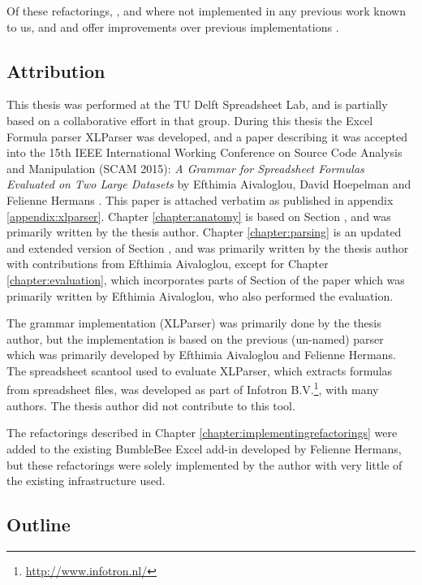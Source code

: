 Of these refactorings, ,  and  where not implemented in any previous work known to us, and  and  offer improvements over previous implementations \cite{badame2012refactoring}.

\newpage

\subsection{Attribution}

This thesis was performed at the TU Delft Spreadsheet Lab, and is partially based on a collaborative effort in that group.
During this thesis the Excel Formula parser XLParser was developed, and a paper describing it was accepted into the 15th IEEE International Working Conference on Source Code Analysis and Manipulation (SCAM 2015): \emph{A Grammar for Spreadsheet Formulas Evaluated on Two Large Datasets} by Efthimia Aivaloglou, David Hoepelman and Felienne Hermans \cite{xlparser}.
This paper is attached verbatim as published in appendix \ref{appendix:xlparser}.
Chapter \ref{chapter:anatomy} is based on Section , and was primarily written by the thesis author.
Chapter \ref{chapter:parsing} is an updated and extended version of Section , and was primarily written by the thesis author with contributions from Efthimia Aivaloglou, except for Chapter \ref{chapter:evaluation}, which incorporates parts of Section  of the paper which was primarily written by Efthimia Aivaloglou, who also performed the evaluation. 

The grammar implementation (XLParser) was primarily done by the thesis author, but the implementation is based on the previous (un-named) parser which was primarily developed by Efthimia Aivaloglou and Felienne Hermans.
The spreadsheet scantool used to evaluate XLParser, which extracts formulas from spreadsheet files, was developed as part of Infotron B.V.\footnote{\url{http://www.infotron.nl/}}, with many authors. The thesis author did not contribute to this tool.

The refactorings described in Chapter \ref{chapter:implementingrefactorings} were added to the existing BumbleBee Excel add-in developed by Felienne Hermans, but these refactorings were solely implemented by the author with very little of the existing infrastructure used.

\subsection{Outline}

